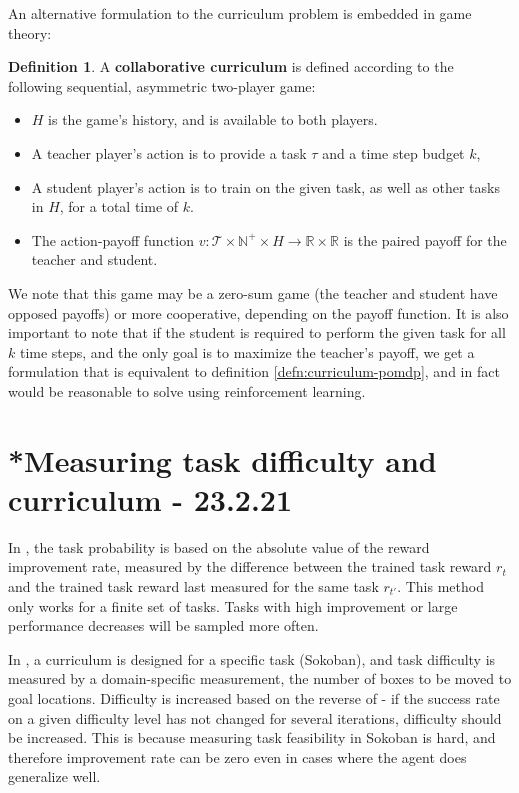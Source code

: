 \documentclass[letterpaper]{article}
\theoremstyle{definition}
\newtheorem{defn}{Definition}[section]
\begin{document}
An alternative formulation to the curriculum problem is embedded in game theory:
\begin{defn} \label{defn:curriculum-game-theory}
	A \textbf{collaborative curriculum} is defined according to the following sequential, asymmetric two-player game:
	\begin{itemize}
	\item $H$ is the game's history, and is available to both players.
	\item A teacher player's action is to provide a task $\tau$ and a time step budget $k$,
	\item A student player's action is to train on the given task, as well as other tasks in $H$, for a total time of $k$.
	\item The action-payoff function $v:\mathcal{T}\times \mathbb{N^+} \times H \rightarrow \mathbb{R}\times \mathbb{R}$ is the paired payoff for the teacher and student. 
	\end{itemize}
\end{defn}

We note that this game may be a zero-sum game (the teacher and student have opposed payoffs) or more cooperative, depending on the payoff function.
It is also important to note that if the student is required to perform the given task for all $k$ time steps, and the only goal is to maximize the teacher's payoff, we get a formulation that is equivalent to definition \ref{defn:curriculum-pomdp}, and in fact would be reasonable to solve using reinforcement learning.


\section{*Measuring task difficulty and curriculum - 23.2.21} \label{sec:difficulty}

In \cite{Matiisen2020}, the task probability is based on the absolute value of the reward improvement rate, measured by the difference between the trained task reward $r_t$ and the trained task reward last measured for the same task $r_{t'}$.
This method only works for a finite set of tasks. Tasks with high improvement or large performance decreases will be sampled more often.

In \cite{Feng2020}, a curriculum is designed for a specific task (Sokoban), and task difficulty is measured by a domain-specific measurement, the number of boxes to be moved to goal locations. Difficulty is increased based on the reverse of \cite{Matiisen2020} - if the success rate on a given difficulty level has not changed for several iterations, difficulty should be increased. This is because measuring task feasibility in Sokoban is hard, and therefore improvement rate can be zero even in cases where the agent does generalize well.
\end{document}
